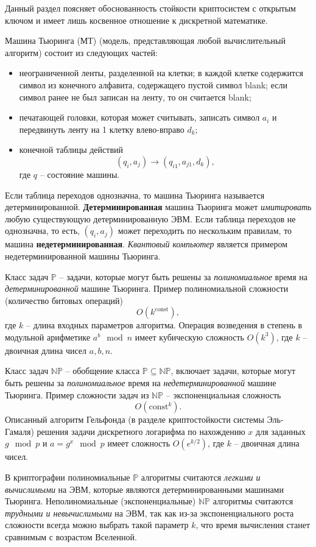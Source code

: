 \documentclass[10pt,a4paper]{book}
\newcommand{\set}[1]{\mathbb{#1}}
\begin{document}
Данный раздел поясняет обоснованность стойкости криптосистем с открытым ключом и имеет лишь косвенное отношение к дискретной математике.

Машина Тьюринга (МТ) (модель, представляющая любой вычислительный алгоритм) состоит из следующих частей:
\begin{itemize}
    \item неограниченной ленты, разделенной на клетки; в каждой клетке содержится символ из конечного алфавита, содержащего пустой символ blank; если символ ранее не был записан на ленту, то он считается blank;
    \item печатающей головки, которая может считывать, записать символ $a_i$ и передвинуть ленту на 1 клетку влево-вправо $d_k$;
    \item конечной таблицы действий
    \[ (q_i, a_j) \rightarrow (q_{i1}, a_{j1}, d_k), \]
где $q$ -- состояние машины.
\end{itemize}

Если таблица переходов однозначна, то машина Тьюринга называется детерминированной. \textbf{Детерминированная} машина Тьюринга может \emph{имитировать} любую существующую детерминированную ЭВМ. Если таблица переходов не однозначна, то есть, $(q_i, a_j)$ может переходить по нескольким правилам, то машина \textbf{недетерминированная}. \emph{Квантовый компьютер} является примером недетерминированной машины Тьюринга.

Класс задач $\set{P}$ -- задачи, которые могут быть решены за \emph{полиномиальное} время на \emph{детерминированной} машине Тьюринга. Пример полиномиальной сложности (количество битовых операций)
    \[ O(k^{\textrm{const}}), \]
где $k$ -- длина входных параметров алгоритма. Операция возведения в степень в модульной арифметике $a^b \mod n$ имеет кубическую сложность $O(k^3)$, где $k$ -- двоичная длина чисел $a,b,n$.

Класс задач $\set{NP}$ -- обобщение класса $\set{P} \subseteq \set{NP}$, включает задачи, которые могут быть решены за \emph{полиномиальное} время на \emph{недетерминированной} машине Тьюринга. Пример сложности задач из $\set{NP}$ -- экспоненциальная сложность
    \[ O(\textrm{const}^k). \]
Описанный алгоритм Гельфонда (в разделе криптостойкости системы Эль-Гамаля) решения задачи дискретного логарифма по нахождению $x$ для заданных $g \mod p$ и $a = g^x \mod p$ имеет сложность $O(e^{k/2})$, где $k$ -- двоичная длина чисел.

В криптографии полиномиальные $\set{P}$ алгоритмы считаются \emph{легкими и вычислимыми} на ЭВМ, которые являются детерминированными машинами Тьюринга. Неполиномиальные (экспоненциальные) $\set{NP}$ алгоритмы считаются \emph{трудными и невычислимыми} на ЭВМ, так как из-за экспоненциального роста сложности всегда можно выбрать такой параметр $k$, что время вычисления станет сравнимым с возрастом Вселенной.
\end{document}
